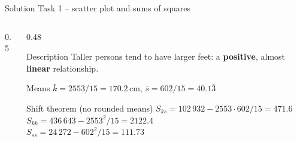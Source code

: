 \documentclass[aspectratio=169,11pt]{beamer}
\newcommand{\heightpoints}{\addplot[only marks, mark=*, mark size=2.2pt, color=hsbiblau]
  coordinates {(164,39) (162,38) (168,39) (198,46) (166,40) (166,39) (192,45) (160,37) (151,36) (175,42) (180,43) (160,38) (168,41) (175,40) (168,39)};}
\begin{document}
\begin{frame}{Solution Task 1 -- scatter plot and sums of squares}
  \begin{columns}[T]
    \begin{column}{0.5\textwidth}
    \end{column}
    \begin{column}{0.48\textwidth}
      \small
      \begin{exampleblock}{Description}
        Taller persons tend to have larger feet: a \textbf{positive}, almost
        \textbf{linear} relationship.
      \end{exampleblock}
      \begin{block}{Means}
        $\bar{k} = 2553/15 = 170.2$\,cm, \quad
        $\bar{s} = 602/15 = 40.1\overline{3}$
      \end{block}
      \begin{block}{Shift theorem (no rounded means)}
        $S_{ks} = 102\,932 - 2553 \cdot 602/15 = \mathbf{471.6}$\\
        $S_{kk} = 436\,643 - 2553^2/15 = \mathbf{2122.4}$\\
        $S_{ss} = 24\,272 - 602^2/15 = \mathbf{111.73}$
      \end{block}
    \end{column}
  \end{columns}
\end{frame}
\end{document}
